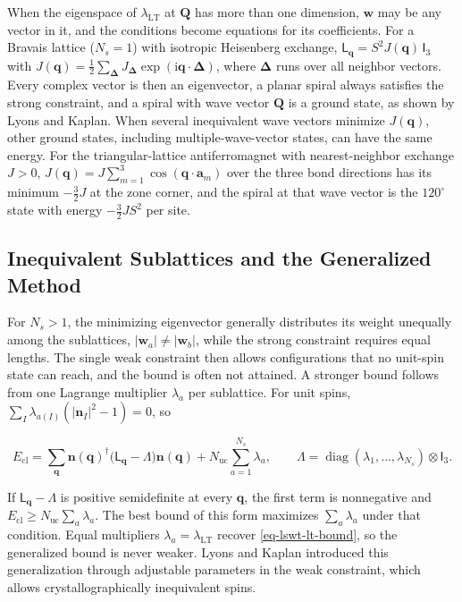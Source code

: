 When the eigenspace of \(\lambda_{\mathrm{LT}}\) at \(\mathbf Q\) has more than one dimension, \(\mathbf w\) may be any vector in it, and the conditions become equations for its coefficients. For a Bravais lattice (\(N_s=1\)) with isotropic Heisenberg exchange, \(\mathsf L_{\mathbf q}=S^2J(\mathbf q)\,\mathsf I_3\) with \(J(\mathbf q)=\frac12\sum_{\boldsymbol\Delta}J_{\boldsymbol\Delta}\exp(\mathrm i\mathbf q\cdot\boldsymbol\Delta)\), where \(\boldsymbol\Delta\) runs over all neighbor vectors. Every complex vector is then an eigenvector, a planar spiral always satisfies the strong constraint, and a spiral with wave vector \(\mathbf Q\) is a ground state, as shown by Lyons and Kaplan. When several inequivalent wave vectors minimize \(J(\mathbf q)\), other ground states, including multiple-wave-vector states, can have the same energy. For the triangular-lattice antiferromagnet with nearest-neighbor exchange \(J>0\), \(J(\mathbf q)=J\sum_{m=1}^{3}\cos(\mathbf q\cdot\mathbf a_m)\) over the three bond directions has its minimum \(-\frac32J\) at the zone corner, and the spiral at that wave vector is the \(120^\circ\) state with energy \(-\frac32JS^2\) per site.

\subsection{Inequivalent Sublattices and the Generalized Method}

For \(N_s>1\), the minimizing eigenvector generally distributes its weight unequally among the sublattices, \(|\mathbf w_a|\neq|\mathbf w_b|\), while the strong constraint requires equal lengths. The single weak constraint then allows configurations that no unit-spin state can reach, and the bound is often not attained. A stronger bound follows from one Lagrange multiplier \(\lambda_a\) per sublattice. For unit spins, \(\sum_I\lambda_{a(I)}(|\mathbf n_I|^2-1)=0\), so

\[
E_{\mathrm{cl}}
=\sum_{\mathbf q}\mathbf n(\mathbf q)^\dagger\big(\mathsf L_{\mathbf q}-\Lambda\big)\mathbf n(\mathbf q)
+N_{\mathrm{uc}}\sum_{a=1}^{N_s}\lambda_a,
\qquad
\Lambda=\operatorname{diag}(\lambda_1,\ldots,\lambda_{N_s})\otimes\mathsf I_3.
\]

If \(\mathsf L_{\mathbf q}-\Lambda\) is positive semidefinite at every \(\mathbf q\), the first term is nonnegative and \(E_{\mathrm{cl}}\ge N_{\mathrm{uc}}\sum_a\lambda_a\). The best bound of this form maximizes \(\sum_a\lambda_a\) under that condition. Equal multipliers \(\lambda_a=\lambda_{\mathrm{LT}}\) recover \eqref{eq-lswt-lt-bound}, so the generalized bound is never weaker. Lyons and Kaplan introduced this generalization through adjustable parameters in the weak constraint, which allows crystallographically inequivalent spins.

